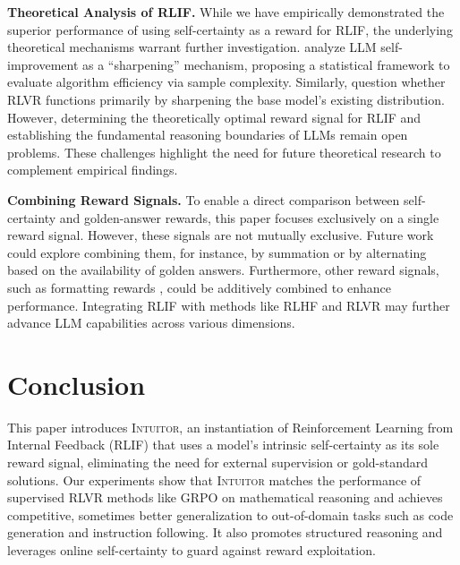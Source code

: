 \documentclass{article} %
\newcommand{\methodname}{\textsc{Intuitor}\xspace}
\begin{document}
\textbf{Theoretical Analysis of RLIF. } While we have empirically demonstrated the superior performance of using self-certainty as a reward for RLIF, the underlying theoretical mechanisms warrant further investigation. \citet{huang2025self} analyze LLM self-improvement as a ``sharpening'' mechanism, proposing a statistical framework to evaluate algorithm efficiency via sample complexity. Similarly, \citet{yue2025does} question whether RLVR functions primarily by sharpening the base model's existing distribution. However, determining the theoretically optimal reward signal for RLIF and establishing the fundamental reasoning boundaries of LLMs remain open problems. These challenges highlight the need for future theoretical research to complement empirical findings.

\textbf{Combining Reward Signals. }
To enable a direct comparison between self-certainty and golden-answer rewards, this paper focuses exclusively on a single reward signal. However, these signals are not mutually exclusive. Future work could explore combining them, for instance, by summation or by alternating based on the availability of golden answers. Furthermore, other reward signals, such as formatting rewards \citep{guo2025deepseek}, could be additively combined to enhance performance. Integrating RLIF with methods like RLHF and RLVR may further advance LLM capabilities across various dimensions.


\section{Conclusion}
This paper introduces \methodname, an instantiation of Reinforcement Learning from Internal Feedback (RLIF) that uses a model’s intrinsic self-certainty as its sole reward signal, eliminating the need for external supervision or gold-standard solutions. Our experiments show that \methodname matches the performance of supervised RLVR methods like GRPO on mathematical reasoning and achieves competitive, sometimes better generalization to out-of-domain tasks such as code generation and instruction following. It also promotes structured reasoning and leverages online self-certainty to guard against reward exploitation. 
\end{document}
